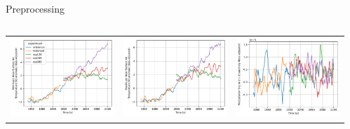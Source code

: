 \documentclass[aspectratio=169]{beamer}
\begin{document}
\begin{frame}{Preprocessing}
\begin{columns}[T]
\begin{column}{0.60\textwidth}
{\begin{center}
\begin{tabular}{ccc}
      \includegraphics[width=0.25\columnwidth]{tasmin_anomaly_adjusted} & \includegraphics[width=0.25\columnwidth]{tasmax_anomaly_adjusted} & \includegraphics[width=0.25\columnwidth]{pr_anomaly_adjusted}
    \end{tabular}
  \end{center}
  }
\end{column}
\begin{column}{0.40\textwidth}
\end{column}
\end{columns}
\end{frame}
\end{document}
